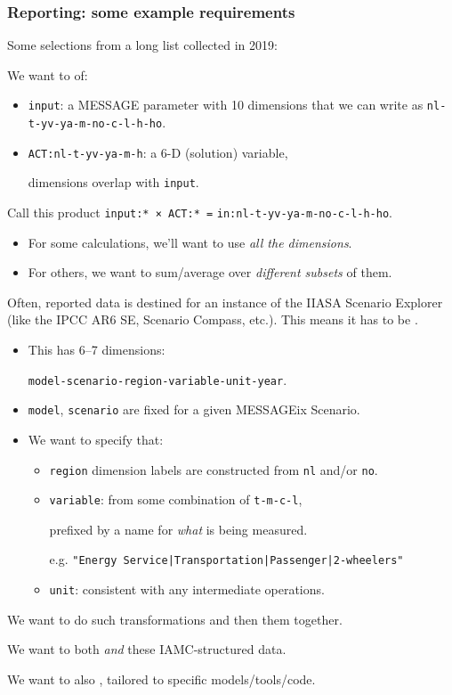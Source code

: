 \documentclass[12pt,aspectratio=169]{beamer}
\newcommand{\py}[1]{\texttt{#1}}
\begin{document}
\begin{frame}[allowframebreaks]
\frametitle{Reporting: some example requirements}
Some selections from a long list collected in 2019:

\medskip
We want to  of:
\begin{itemize}
  \item \texttt{input}: a MESSAGE parameter with 10 dimensions
    that we can write as \texttt{nl-t-yv-ya-m-no-c-l-h-ho}.
  \item \texttt{ACT:nl-t-yv-ya-m-h}: a 6-D (solution) variable,

    dimensions overlap with \texttt{input}.
\end{itemize}

\medskip
Call this product \texttt{input:* × ACT:* =} \texttt{in:nl-t-yv-ya-m-no-c-l-h-ho}.
\begin{itemize}
  \item For some calculations, we'll want to use \emph{all the dimensions}.
  \item For others, we want to sum/average over \emph{different subsets} of them.
\end{itemize}

\framebreak
Often, reported data is destined for an instance of the IIASA Scenario Explorer
(like the IPCC AR6 SE, Scenario Compass, etc.).
This means it has to be .
\begin{itemize}
  \item This has 6–7 dimensions:

    \texttt{model-scenario-region-variable-unit-year}.
  \item \texttt{model}, \texttt{scenario} are fixed for a given MESSAGEix Scenario.
  \item We want to specify that:
    \begin{itemize}
      \item \texttt{region} dimension labels are constructed from \texttt{nl} and/or \texttt{no}.
      \item \texttt{variable}: from some combination of \texttt{t-m-c-l},

        prefixed by a name for \emph{what} is being measured.

        e.g. \py{"Energy Service|Transportation|Passenger|2-wheelers"}
      \item \texttt{unit}: consistent with any intermediate operations.
    \end{itemize}
\end{itemize}


\framebreak
We want to do  such transformations
and then  them together.

\bigskip
We want to both 
\emph{and}  these IAMC-structured data.

\bigskip
We want to also ,
tailored to specific models/tools/code.

\end{frame}
\end{document}
